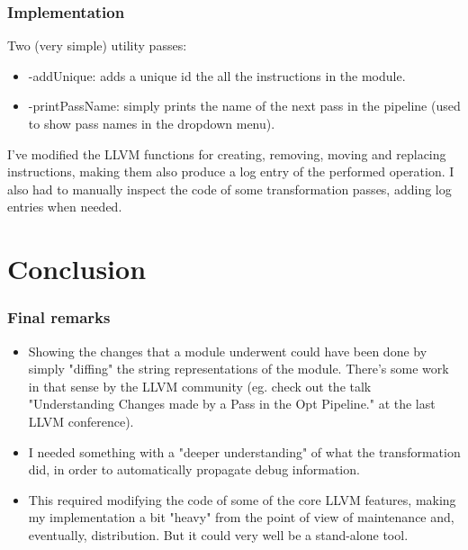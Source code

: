 \documentclass{beamer}
\begin{document}
\begin{frame}
\frametitle{Implementation}
Two (very simple) utility passes:
\begin{itemize}
\item -addUnique: adds a unique id the all the instructions in the module.
\item -printPassName: simply prints the name of the next pass in the pipeline (used to show pass names in the dropdown menu).
\end{itemize}
I've modified the LLVM functions for creating, removing, moving and replacing instructions, making them also produce a log entry of the performed operation. \newline
I also had to manually inspect the code of some transformation passes, adding log entries when needed.
\end{frame}

\section{Conclusion}
\begin{frame}
\frametitle{Final remarks}
\begin{itemize}
\item Showing the changes that a module underwent could have been done by simply "diffing" the string representations of the module. There's some work in that sense by the LLVM community (eg. check out the talk "Understanding Changes made by a Pass in the Opt Pipeline." at the last LLVM conference).
\item I needed something with a "deeper understanding" of what the transformation did, in order to automatically propagate debug information.
\item This required modifying the code of some of the core LLVM features, making my implementation a bit "heavy" from the point of view of maintenance and, eventually, distribution. But it could very well be a stand-alone tool.
\end{itemize}
\end{frame}
\end{document}
